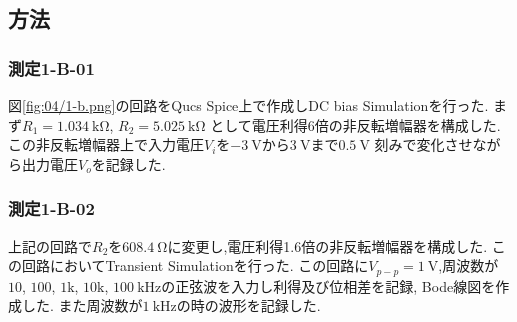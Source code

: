 \subsection{方法}
\subsubsection{測定1-B-01}
図\ref{fig:04/1-b.png}の回路をQucs Spice上で作成しDC bias Simulationを行った.
まず$R_1=1.034\ \si{\kilo\ohm}$, $R_2=5.025\ \si{\kilo\ohm}$
として電圧利得6倍の非反転増幅器を構成した.この非反転増幅器上で入力電圧$V_i$を$-3\ \si{\volt}$から$3\ \si{\volt}$まで$0.5\ \si{\volt}$
刻みで変化させながら出力電圧$V_o$を記録した.
\subsubsection{測定1-B-02}
上記の回路で$R_2$を$608.4\ \si{\ohm}$に変更し,電圧利得1.6倍の非反転増幅器を構成した.
この回路においてTransient Simulationを行った.
この回路に$V_{p-p}=1\ \si{\volt}$,周波数が$10$, $100$, $1\si{\kilo}$, $10\si{\kilo}$, $100\ \si{\kilo\hertz}$の正弦波を入力し利得及び位相差を記録, Bode線図を作成した.
また周波数が$1\ \si{\kilo\hertz}$の時の波形を記録した.